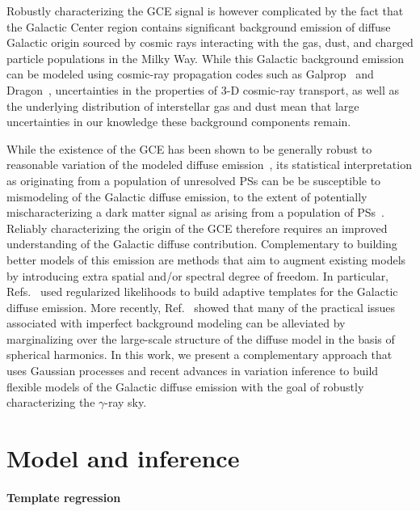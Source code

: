 \documentclass[]{article}
\begin{document}
Robustly characterizing the GCE signal is however complicated by the fact that the Galactic Center region contains significant background emission of diffuse Galactic origin sourced by cosmic rays interacting with the gas, dust, and charged particle populations in the Milky Way. While this Galactic background emission can be modeled using cosmic-ray propagation codes such as Galprop~\cite{galprop,Strong:1999sv} and  Dragon~\cite{Evoli:2016xgn}, uncertainties in the properties of 3-D cosmic-ray transport, as well as the underlying distribution of interstellar gas and dust mean that large uncertainties in our knowledge these background components remain.

While the existence of the GCE has been shown to be generally robust to reasonable variation of the modeled diffuse emission~\cite{Daylan:2014rsa,Calore:2014xka,TheFermi-LAT:2015kwa,Linden:2016rcf}, its statistical interpretation as originating from a population of unresolved PSs can be be susceptible to mismodeling of the Galactic diffuse emission, to the extent of potentially mischaracterizing a dark matter signal as arising from a population of PSs~\cite{Lee:2015fea,Leane:2019uhc}. Reliably characterizing the origin of the GCE therefore requires an improved understanding of the Galactic diffuse contribution. Complementary to building better models of this emission are methods that aim to augment existing models by introducing extra spatial and/or spectral degree of freedom. In particular, Refs.~\cite{Storm:2017arh,Bartels:2017vsx} used regularized likelihoods to build adaptive templates for the Galactic diffuse emission. More recently, Ref.~\cite{Buschmann:2020adf} showed that many of the practical issues associated with imperfect background modeling can be alleviated by marginalizing over the large-scale structure of the diffuse model in the basis of spherical harmonics. In this work, we present a complementary approach that uses Gaussian processes and recent advances in variation inference to build flexible models of the Galactic diffuse emission with the goal of robustly characterizing the $\gamma$-ray sky.

\section{Model and inference}
\label{sec:model}

\paragraph{Template regression}
\end{document}
